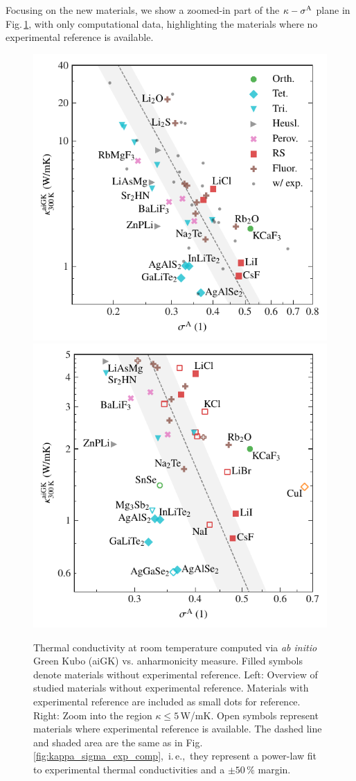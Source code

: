 Focusing on the new materials, we show a zoomed-in part of the $\kappa-\sigma^\mathrm{A}$ plane in Fig.\,\ref{fig:kappa_sigma}, with only computational data, highlighting the materials where no experimental reference is available.
%
\begin{figure}
	\includegraphics[width=.49\textwidth]{./data/plots/kappa_vs_sigma_trusted/kappa_vs_sigma_trusted.pdf}
	\hfill
	\includegraphics[width=.49\textwidth]{./data/plots/kappa_vs_sigma_trusted/kappa_vs_sigma_trusted_experiment_zoom.pdf}
	\caption{
	Thermal conductivity at room temperature computed via \emph{ab initio} Green Kubo (aiGK) vs. anharmonicity measure. Filled symbols denote materials without experimental reference. Left: Overview of studied materials without experimental reference. Materials with experimental reference are included as small dots for reference. Right: Zoom into the region $\kappa \leq 5$\,W/mK. Open symbols represent materials where experimental reference is available. The dashed line and shaded area are the same as in Fig.\,\ref{fig:kappa_sigma_exp_comp},~i.\,e.,~they represent a power-law fit to experimental thermal conductivities and a $\pm 50\,\%$ margin.}
	\label{fig:kappa_sigma}
\end{figure}
%
